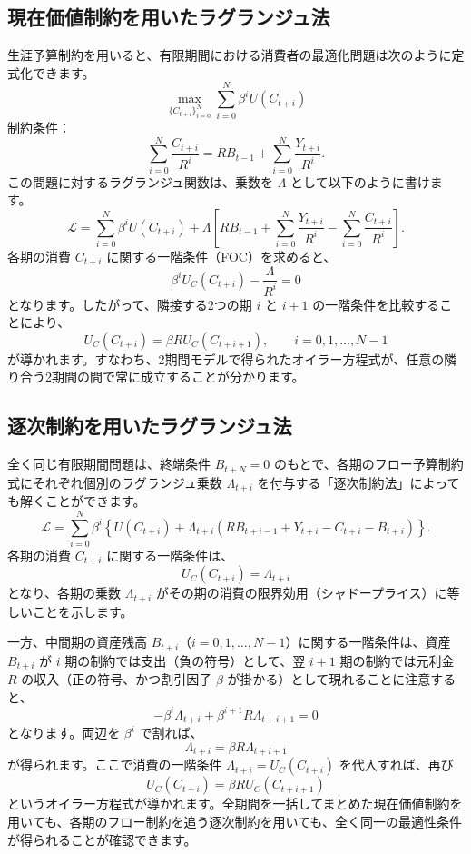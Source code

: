 \documentclass[
  japanese,
  lualatex,
  ja=standard,
  12pt,
  a4paper]{ltjsarticle}
\begin{document}
\subsection{現在価値制約を用いたラグランジュ法}\label{ux73feux5728ux4fa1ux5024ux5236ux7d04ux3092ux7528ux3044ux305fux30e9ux30b0ux30e9ux30f3ux30b8ux30e5ux6cd5}

生涯予算制約を用いると、有限期間における消費者の最適化問題は次のように定式化できます。
\[
\max_{\{C_{t+i}\}_{i=0}^{N}} \sum_{i=0}^{N} \beta^i U(C_{t+i})
\] 制約条件： \[
\sum_{i=0}^{N} \frac{C_{t+i}}{R^i} = R B_{t-1} + \sum_{i=0}^{N} \frac{Y_{t+i}}{R^i}.
\] この問題に対するラグランジュ関数は、乗数を \(\Lambda\)
として以下のように書けます。 \[
\mathcal{L} = \sum_{i=0}^{N} \beta^i U(C_{t+i}) + \Lambda \left[ R B_{t-1} + \sum_{i=0}^{N} \frac{Y_{t+i}}{R^i} - \sum_{i=0}^{N} \frac{C_{t+i}}{R^i} \right].
\] 各期の消費 \(C_{t+i}\) に関する一階条件（FOC）を求めると、 \[
\beta^i U_C(C_{t+i}) - \frac{\Lambda}{R^i} = 0
\] となります。したがって、隣接する2つの期 \(i\) と \(i+1\)
の一階条件を比較することにより、 \[
U_C(C_{t+i}) = \beta R U_C(C_{t+i+1}), \qquad i=0, 1, \dots, N-1
\]
が導かれます。すなわち、2期間モデルで得られたオイラー方程式が、任意の隣り合う2期間の間で常に成立することが分かります。

\subsection{逐次制約を用いたラグランジュ法}\label{ux9010ux6b21ux5236ux7d04ux3092ux7528ux3044ux305fux30e9ux30b0ux30e9ux30f3ux30b8ux30e5ux6cd5}

全く同じ有限期間問題は、終端条件 \(B_{t+N}=0\)
のもとで、各期のフロー予算制約式にそれぞれ個別のラグランジュ乗数
\(\Lambda_{t+i}\) を付与する「逐次制約法」によっても解くことができます。
\[
\mathcal{L} = \sum_{i=0}^{N} \beta^i \left\{ U(C_{t+i}) + \Lambda_{t+i} \left( R B_{t+i-1} + Y_{t+i} - C_{t+i} - B_{t+i} \right) \right\}.
\] 各期の消費 \(C_{t+i}\) に関する一階条件は、 \[
U_C(C_{t+i}) = \Lambda_{t+i}
\] となり、各期の乗数 \(\Lambda_{t+i}\)
がその期の消費の限界効用（シャドープライス）に等しいことを示します。

一方、中間期の資産残高
\(B_{t+i}\)（\(i=0, 1, \dots, N-1\)）に関する一階条件は、資産
\(B_{t+i}\) が \(i\) 期の制約では支出（負の符号）として、翌 \(i+1\)
期の制約では元利金 \(R\) の収入（正の符号、かつ割引因子 \(\beta\)
が掛かる）として現れることに注意すると、 \[
-\beta^i \Lambda_{t+i} + \beta^{i+1} R \Lambda_{t+i+1} = 0
\] となります。両辺を \(\beta^i\) で割れば、 \[
\Lambda_{t+i} = \beta R \Lambda_{t+i+1}
\] が得られます。ここで消費の一階条件 \(\Lambda_{t+i} = U_C(C_{t+i})\)
を代入すれば、再び \[
U_C(C_{t+i}) = \beta R U_C(C_{t+i+1})
\]
というオイラー方程式が導かれます。全期間を一括してまとめた現在価値制約を用いても、各期のフロー制約を追う逐次制約を用いても、全く同一の最適性条件が得られることが確認できます。
\end{document}

